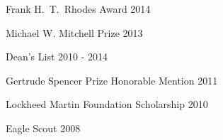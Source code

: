 
Frank H.\ T.\ Rhodes Award \hfill 2014

Michael W. Mitchell Prize \hfill 2013

Dean's List \hfill 2010 - 2014

Gertrude Spencer Prize Honorable Mention \hfill 2011

Lockheed Martin Foundation Scholarship \hfill 2010

Eagle Scout \hfill 2008

